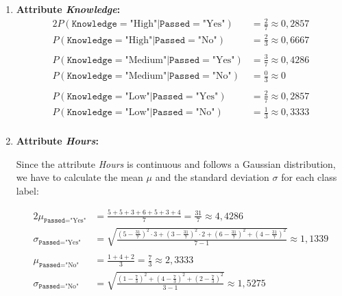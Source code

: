 \documentclass[
english,
smallborders
]{i6prcsht}
\newcommand{\Likelihood}[4]{P(\texttt{#1}=\text{"#2"} | \texttt{#3}=\text{"#4"})}
\begin{document}
\begin{solution}
\begin{enumerate}
\begin{enumerate}
			      \item \textbf{Attribute \textit{Knowledge}:}
			            \begin{alignat*}{2}
				            \Likelihood{Knowledge}{High}{Passed}{Yes}   & = \frac{2}{7} \approx 0,2857 \\
				            \Likelihood{Knowledge}{High}{Passed}{No}    & = \frac{2}{3} \approx 0,6667 \\
				                                                        &                              \\
				            \Likelihood{Knowledge}{Medium}{Passed}{Yes} & = \frac{3}{7} \approx 0,4286 \\
				            \Likelihood{Knowledge}{Medium}{Passed}{No}  & = \frac{0}{3} \approx 0      \\
				                                                        &                              \\
				            \Likelihood{Knowledge}{Low}{Passed}{Yes}    & = \frac{2}{7} \approx 0,2857 \\
				            \Likelihood{Knowledge}{Low}{Passed}{No}     & = \frac{1}{3} \approx 0,3333 \\
			            \end{alignat*}
			            
			      \item \textbf{Attribute \textit{Hours}:}
			            
			            Since the attribute \textit{Hours} is continuous and follows a Gaussian distribution, we have to calculate the mean $\mu$ and the standard deviation $\sigma$ for each class label:
			            
			            \begin{alignat*}{2}
				            \mu_{\texttt{Passed}=\text{"Yes"}}    & = \frac{5 + 5 + 3 + 6 + 5 + 3 + 4}{7} = \frac{31}{7} \approx 4,4286                                                                   \\
				            \sigma_{\texttt{Passed}=\text{"Yes"}} & = \sqrt{\frac{(5-\frac{31}{7})^2 \cdot 3 + (3-\frac{31}{7})^2 \cdot 2 + (6-\frac{31}{7})^2 + (4-\frac{31}{7})^2}{7-1}} \approx 1,1339 \\
				                                                  &                                                                                                                                       \\
				            \mu_{\texttt{Passed}=\text{"No"}}     & = \frac{1 + 4 + 2}{3} = \frac{7}{3} \approx 2,3333                                                                                    \\
				            \sigma_{\texttt{Passed}=\text{"No"}}  & = \sqrt{\frac{(1-\frac{7}{3})^2 + (4-\frac{7}{3})^2 + (2-\frac{7}{3})^2}{3-1}} \approx 1,5275                                         \\
			            \end{alignat*}
			            

\end{enumerate}
\end{enumerate}
\end{solution}
\end{document}
